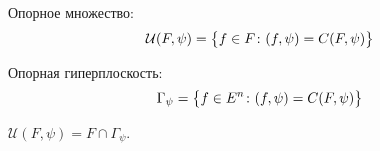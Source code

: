 \begin{defn}
    Опорное множество:
    \begin{equation*}
        \mathcal{U}(F, \psi) = \bigl\{ f \in F\colon (f, \psi) = C(F, \psi) \bigr\}
    \end{equation*}
\end{defn}
\begin{defn}
    Опорная гиперплоскость:
    \begin{equation*}
        \Gamma_{\psi} = \bigl\{ f \in E^n\colon (f, \psi) = C(F, \psi) \bigr\}
    \end{equation*}
\end{defn}

\begin{rmrk}
    $\mathcal{U}(F, \psi) = F \cap \Gamma_{\psi}$.
\end{rmrk}


